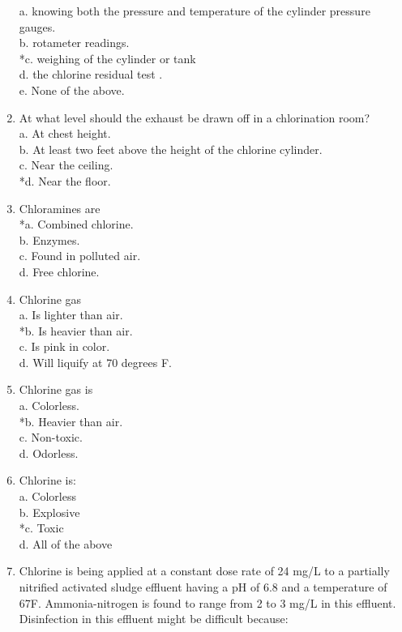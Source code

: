 \begin{enumerate}
a. knowing both the pressure and temperature of the cylinder pressure gauges. \\
b. rotameter readings. \\
*c. weighing of the cylinder or tank \\
d. the chlorine residual test . \\
e. None of the above. \\
\item At what level should the exhaust be drawn off in a chlorination room? \\
a. At chest height. \\
b. At least two feet above the height of the chlorine cylinder. \\
c. Near the ceiling. \\
*d. Near the floor. \\
\item Chloramines are \\
*a. Combined chlorine. \\
b. Enzymes. \\
c. Found in polluted air. \\
d. Free chlorine. \\
\item Chlorine gas \\
a. Is lighter than air. \\
*b. Is heavier than air. \\
c. Is pink in color. \\
d. Will liquify at 70 degrees F. \\
\item Chlorine gas is \\
a. Colorless. \\
*b. Heavier than air. \\
c. Non-toxic. \\
d. Odorless. \\
\item Chlorine is: \\
a. Colorless \\
b. Explosive \\
*c. Toxic \\
d. All of the above \\
\item Chlorine is being applied at a constant dose rate of 24 mg/L to a partially nitrified activated sludge effluent having a pH of 6.8 and a temperature of 67F.  Ammonia-nitrogen is found to range from 2 to 3 mg/L in this effluent. Disinfection in this effluent might be difficult because: \\

\end{enumerate}
